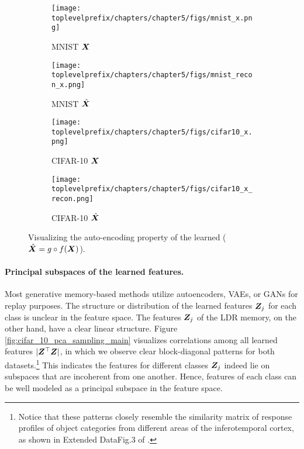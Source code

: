 \documentclass[\toplevelprefix/book-main.tex]{subfiles}
\begin{document}
\begin{figure}[t]
    \begin{subfigure}[t]{0.20\textwidth}
        \centering
        \texttt{[image: \\toplevelprefix/chapters/chapter5/figs/mnist\_x.png]}
        \caption{MNIST $\bm{X}$}
    \end{subfigure}
    \hfill
    \begin{subfigure}[t]{0.20\textwidth}
        \centering
        \texttt{[image: \\toplevelprefix/chapters/chapter5/figs/mnist\_recon\_x.png]}
        \caption{MNIST $\hat{\bm{X}}$}
    \end{subfigure}
    \hfill
    \begin{subfigure}[t]{0.20\textwidth}
        \centering
        \texttt{[image: \\toplevelprefix/chapters/chapter5/figs/cifar10\_x.png]}
        \caption{CIFAR-10 $\bm{X}$}
    \end{subfigure}
    \hfill
    \begin{subfigure}[t]{0.20\textwidth}
        \centering
        \texttt{[image: \\toplevelprefix/chapters/chapter5/figs/cifar10\_x\_recon.png]}
        \caption{CIFAR-10 $\hat{\bm{X}}$}
    \end{subfigure}
    \caption{\small Visualizing the auto-encoding property of the learned  ($\hat{\bm{X}} = g\circ f(\bm{X})$). }
        \label{fig:justfy_xhat_equals_x_incremental}
\end{figure}


\paragraph{Principal subspaces of the learned features.}
Most generative memory-based methods utilize autoencoders, VAEs, or GANs for replay purposes. The structure or distribution of the learned features $\bm{Z}_j$ for each class is  unclear in the feature space. The features $\bm{Z}_j$ of the LDR memory, on the other hand, have a clear linear structure. Figure \ref{fig:cifar_10_pca_sampling_main} visualizes correlations among all learned features $|\bm{Z}^\top\bm{Z}|$, in which we observe clear block-diagonal patterns for both datasets.\footnote{Notice that these patterns closely resemble the similarity matrix of response profiles of object categories from different areas of the inferotemporal cortex, as shown in  Extended DataFig.3 of \cite{Bao2020AMO}.} This indicates the features for different classes $\bm{Z}_j$ indeed lie on subspaces that are incoherent from one another. Hence, features of each class can be well modeled as a principal subspace in the feature space. %
\end{document}

